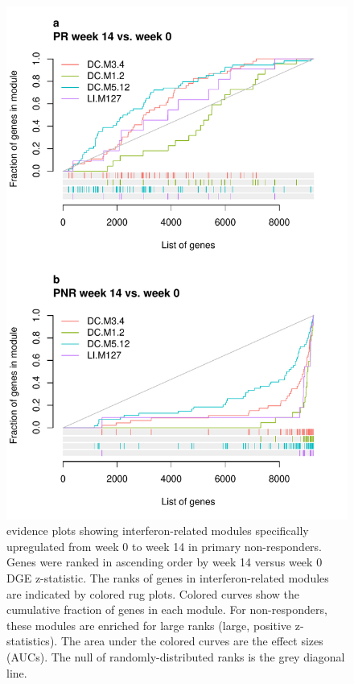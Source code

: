 \begin{figure}
    \centering
    \includegraphics[width=1.0\textwidth,page=1]{mainmatter/figures/chapter_04/plot_gene_set_enrichment.evidencePlots_C_3_1_Interferon.pdf}
    \caption{ evidence plots showing interferon-related modules specifically upregulated from week 0 to week 14 in primary non-responders. Genes were ranked in ascending order by week 14 versus week 0 \gls{DGE} z-statistic. The ranks of genes in interferon-related modules are indicated by colored rug plots. Colored curves show the cumulative fraction of genes in each module. For non-responders, these modules are enriched for large ranks (large, positive z-statistics). The area under the colored curves are the effect sizes (\glspl{AUC}). The null of randomly-distributed ranks is the grey diagonal line.}
    \label{fig:multipants_dge_evidencePlots_C_3_1_Interferon}
\end{figure}

